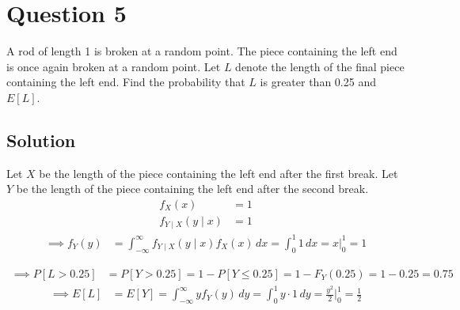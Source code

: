 \section*{Question 5}

A rod of length 1 is broken at a random point.
The piece containing the left end is once again broken at a random point.
Let \( L \) denote the length of the final piece containing the left end.
Find the probability that \( L \) is greater than 0.25 and \( E[L] \).

\subsection*{Solution}

Let \( X \) be the length of the piece containing the left end after the first break.
Let \( Y \) be the length of the piece containing the left end after the second break.
\begin{align*}
    f_{X}(x)
     & =
    1
    \\
    f_{Y \mid X}(y \mid x)
     & =
    1
\end{align*}
\begin{align*}
    \implies
    f_{Y}(y)
     & =
    \int_{-\infty}^{\infty} f_{Y \mid X}(y \mid x) f_{X}(x) \, dx
    =
    \int_{0}^{1} 1 \, dx
    =
    x \Big|_{0}^{1}
    =
    1
\end{align*}

\begin{align*}
    \implies
    P[L>0.25]
     & =
    P[Y>0.25]
    =
    1 - P[Y \leq 0.25]
    =
    1 - F_Y(0.25)
    =
    1 - 0.25
    =
    \boxed{
        0.75
    }
\end{align*}
\begin{align*}
    \implies
    E[L]
     & =
    E[Y]
    =
    \int_{-\infty}^{\infty} y f_Y(y) \, dy
    =
    \int_{0}^{1} y \cdot 1 \, dy
    =
    \frac{y^{2}}{2} \Big|_{0}^{1}
    =
    \boxed{
        \frac{1}{2}
    }
\end{align*}
